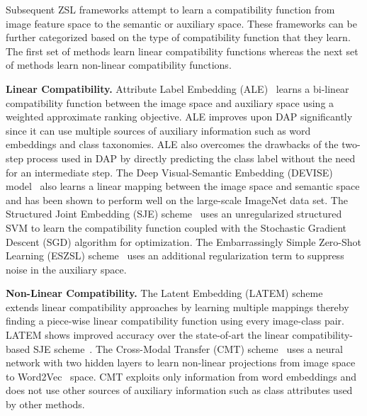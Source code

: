 \par
\medskip

Subsequent ZSL frameworks attempt to learn a compatibility function from image feature space to the semantic or auxiliary space. These frameworks can be further categorized based on the type of compatibility function that they learn. The first set of methods learn linear compatibility functions whereas the next set of methods learn non-linear compatibility functions.

\par
\medskip

\noindent
\textbf{Linear Compatibility.} Attribute Label Embedding (ALE)~\cite{ale} learns a bi-linear compatibility function between the image space and auxiliary space using a weighted approximate ranking objective. ALE improves upon DAP \cite{DAP} significantly since it can use multiple sources of auxiliary information such as word embeddings and class taxonomies. ALE also overcomes the drawbacks of the two-step process used in DAP by directly predicting the class label without the need for an intermediate step. The Deep Visual-Semantic Embedding (DEVISE) model~\cite{devise} also learns a linear mapping between the image space and semantic space and has been shown to perform well on the large-scale ImageNet data set. The Structured Joint Embedding (SJE) scheme~\cite{SJE} uses an unregularized structured SVM to learn the compatibility function coupled with the Stochastic Gradient Descent (SGD) algorithm for optimization. The Embarrassingly Simple Zero-Shot Learning (ESZSL) scheme~\cite{ESZSL} uses an additional regularization term to suppress noise in the auxiliary space. 

\par
\medskip

\noindent
\textbf{Non-Linear Compatibility.}  The Latent Embedding (LATEM) scheme~\cite{LATEM} extends linear compatibility approaches by learning multiple mappings thereby finding a piece-wise linear compatibility function using every image-class pair. LATEM shows improved accuracy over the state-of-art the linear compatibility-based SJE scheme~\cite{SJE}. The Cross-Modal Transfer (CMT) scheme~\cite{CMT} uses a neural network with two hidden layers to learn non-linear projections from image space to Word2Vec~\cite{w2v} space. CMT exploits only information from word embeddings and does not use other sources of auxiliary information such as class attributes used by other methods.

